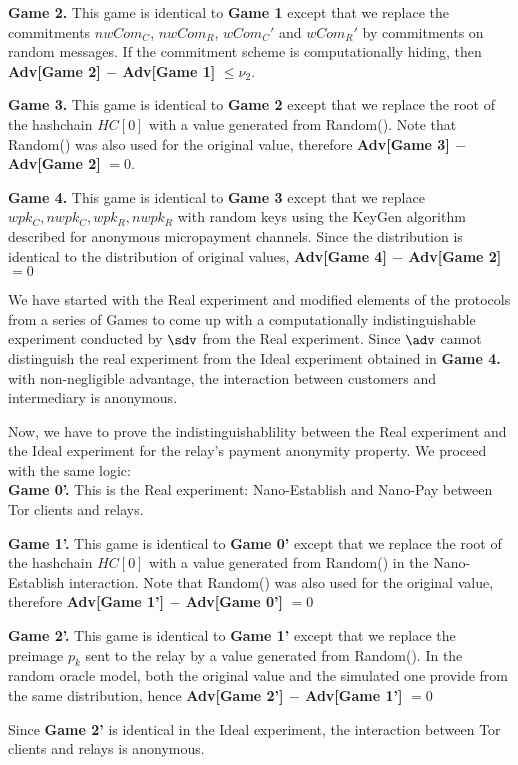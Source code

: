 \textbf{Game 2.} This game is identical to \textbf{Game 1} except that we replace the commitments $nwCom_C$, $nwCom_R$, $wCom_C'$ and $wCom_R'$ by commitments on random messages. If the commitment scheme is computationally hiding, then \textbf{Adv[Game 2] $-$ Adv[Game 1]} $\leq \nu_2$.

\textbf{Game 3.} This game is identical to \textbf{Game 2} except that we replace the root of the hashchain $HC[0]$ with a value generated from Random(). Note that Random() was also used for the original value, therefore \textbf{Adv[Game 3] $-$ Adv[Game 2]} $= 0$.

\textbf{Game 4.} This game is identical to \textbf{Game 3} except that we replace $wpk_C, nwpk_C, wpk_R, nwpk_R$ with random keys using the KeyGen algorithm described for anonymous micropayment channels. Since the distribution is identical to the distribution of original values, \textbf{Adv[Game 4] $-$ Adv[Game 2]} $= 0$

We have started with the Real experiment and modified elements of the protocols from a series of Games to come up with a computationally indistinguishable experiment conducted by $\sdv$ from the Real experiment. Since $\adv$ cannot distinguish the real experiment from the Ideal experiment obtained in \textbf{Game 4.} with non-negligible advantage, the interaction between customers and intermediary is anonymous.

Now, we have to prove the indistinguishablility between the Real experiment and the Ideal experiment for the relay's payment anonymity property. We proceed with the same logic:\\

\textbf{Game 0'.} This is the Real experiment: Nano-Establish and Nano-Pay between Tor clients and relays.

\textbf{Game 1'.} This game is identical to \textbf{Game 0'} except that we replace the root of the hashchain $HC[0]$ with a value generated from Random() in the Nano-Establish interaction. Note that Random() was also used for the original value, therefore \textbf{Adv[Game 1'] $-$ Adv[Game 0']} $= 0$

\textbf{Game 2'.} This game is identical to \textbf{Game 1'} except
that we replace the preimage $p_k$ sent to the relay by a value
generated from Random(). In the random oracle model, both the original
value and the simulated one provide from the same distribution, hence \textbf{Adv[Game 2'] $-$ Adv[Game 1']} $= 0$

Since \textbf{Game 2'} is identical in the Ideal experiment, the interaction between Tor clients and relays is anonymous.

